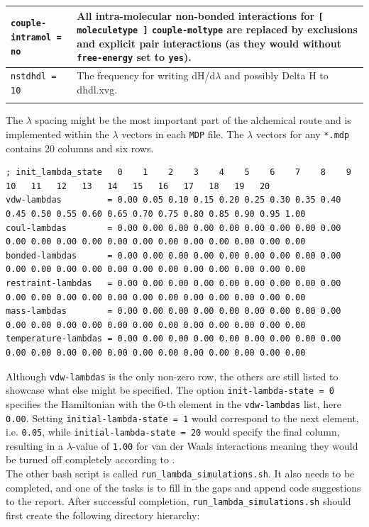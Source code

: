 \documentclass[9pt,tutorial]{livecoms}
\newcommand{\code}[1]{\colorbox{light-gray}{\texttt{#1}}}
\begin{document}
\begin{center}
\begin{tabularx}{\textwidth}{l X}
    \midrule
    \texttt{couple-intramol = no}      & All intra-molecular non-bonded interactions for \texttt{[ moleculetype ]}  \texttt{couple-moltype} are replaced by exclusions and explicit pair interactions (as they would without \texttt{free-energy} set to \texttt{yes}).\\
    \midrule
    \texttt{nstdhdl = 10}              & The frequency for writing dH/d$\lambda$ and possibly Delta H to dhdl.xvg.\\
    \bottomrule
    \label{tab:mdpoptions}
    \end{tabularx}
\end{center}
\twocolumn
The $\lambda$ spacing might be the most important part of the alchemical route and is implemented within the $\lambda$ vectors in each \texttt{MDP} file. The $\lambda$ vectors for any \code{*.mdp} contains 20 columns and six rows.
\begin{lstlisting}
; init_lambda_state   0    1    2    3    4    5    6    7    8    9    10   11   12   13   14   15   16   17   18   19   20
vdw-lambdas         = 0.00 0.05 0.10 0.15 0.20 0.25 0.30 0.35 0.40 0.45 0.50 0.55 0.60 0.65 0.70 0.75 0.80 0.85 0.90 0.95 1.00
coul-lambdas        = 0.00 0.00 0.00 0.00 0.00 0.00 0.00 0.00 0.00 0.00 0.00 0.00 0.00 0.00 0.00 0.00 0.00 0.00 0.00 0.00 0.00
bonded-lambdas      = 0.00 0.00 0.00 0.00 0.00 0.00 0.00 0.00 0.00 0.00 0.00 0.00 0.00 0.00 0.00 0.00 0.00 0.00 0.00 0.00 0.00
restraint-lambdas   = 0.00 0.00 0.00 0.00 0.00 0.00 0.00 0.00 0.00 0.00 0.00 0.00 0.00 0.00 0.00 0.00 0.00 0.00 0.00 0.00 0.00
mass-lambdas        = 0.00 0.00 0.00 0.00 0.00 0.00 0.00 0.00 0.00 0.00 0.00 0.00 0.00 0.00 0.00 0.00 0.00 0.00 0.00 0.00 0.00
temperature-lambdas = 0.00 0.00 0.00 0.00 0.00 0.00 0.00 0.00 0.00 0.00 0.00 0.00 0.00 0.00 0.00 0.00 0.00 0.00 0.00 0.00 0.00
\end{lstlisting}
Although \code{vdw-lambdas} is the only non-zero row, the others are still listed to showcase what else might be specified. The option \texttt{init-lambda-state = 0} specifies the Hamiltonian with the 0-th element in the \texttt{vdw-lambdas} list, here \code{0.00}. Setting \texttt{initial-lambda-state = 1} would correspond to the next element, i.e. \code{0.05}, while \texttt{initial-lambda-state = 20} would specify the final column, resulting in a $\lambda$-value of \code{1.00} for van der Waals interactions meaning they would be turned off completely according to .\\
The other bash script is called \code{run\_lambda\_simulations.sh}. It also needs to be completed, and one of the tasks is to fill in the gaps and append code suggestions to the report. After successful completion, \code{run\_lambda\_simulations.sh} should first create the following directory hierarchy:
\end{document}
